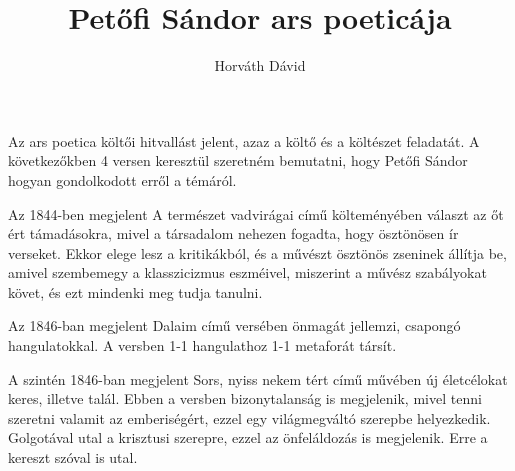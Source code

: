 \documentclass[]{article}
\title{Petőfi Sándor ars poeticája}
\author{Horváth Dávid}
\begin{document}
	\maketitle
	Az ars poetica költői hitvallást jelent, azaz a költő és a költészet feladatát. A következőkben 4 versen keresztül szeretném bemutatni, hogy Petőfi Sándor hogyan gondolkodott erről a témáról.
	
	Az 1844-ben megjelent A természet vadvirágai című költeményében választ az őt ért támadásokra, mivel a társadalom nehezen fogadta, hogy ösztönösen ír verseket. Ekkor elege lesz a kritikákból, és a művészt ösztönös zseninek állítja be, amivel szembemegy a klasszicizmus eszméivel, miszerint a művész szabályokat követ, és ezt mindenki meg tudja tanulni.
	
	Az 1846-ban megjelent Dalaim című versében önmagát jellemzi, csapongó hangulatokkal. A versben 1-1 hangulathoz 1-1 metaforát társít.
	
	A szintén 1846-ban megjelent Sors, nyiss nekem tért című művében új életcélokat keres, illetve talál. Ebben a versben bizonytalanság is megjelenik, mivel tenni szeretni valamit az emberiségért, ezzel egy világmegváltó szerepbe helyezkedik. Golgotával utal a krisztusi szerepre, ezzel az önfeláldozás is megjelenik. Erre a kereszt szóval is utal.
	
	
\end{document}
